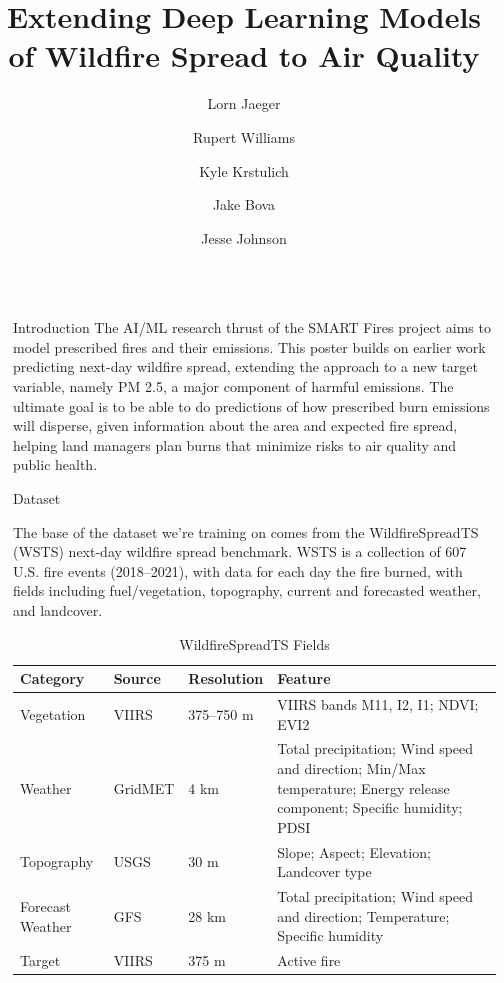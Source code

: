 \documentclass[final]{beamer}
\title{Extending Deep Learning Models of Wildfire Spread to Air Quality}
\author{Lorn Jaeger   \and Rupert Williams  \and Kyle Krstulich \and Jake Bova \and Jesse Johnson}
\newlength{\sepwidth}
\newlength{\colwidth}
\newcommand{\separatorcolumn}{\begin{column}{\sepwidth}\end{column}}
\begin{document}


\begin{frame}[t]
\begin{columns}[t]
\separatorcolumn

\begin{column}{\colwidth}

  \begin{block}{Introduction}
    The AI/ML research thrust of the SMART Fires project aims to model prescribed fires and their emissions. This poster builds on earlier work predicting next-day wildfire spread, extending the approach to a new target variable, namely PM 2.5, a major component of harmful emissions. The ultimate goal is to be able to do predictions of how prescribed burn emissions will disperse, given information about the area and expected fire spread, helping land managers plan burns that minimize risks to air quality and public health.

  \end{block}


  \begin{block}{Dataset}

The base of the dataset we're training on comes from the WildfireSpreadTS (WSTS) next-day wildfire spread benchmark. WSTS is a collection of 607 U.S. fire events (2018–2021), with data for each day the fire burned, with fields including fuel/vegetation, topography, current and forecasted weather, and landcover. 

\begin{table}[h!]
\centering
\small
\begin{tabular}{l l l p{12cm}}
\toprule
\textbf{Category} & \textbf{Source} & \textbf{Resolution} & \textbf{Feature} \\
\midrule
Vegetation & VIIRS   & 375--750 m & VIIRS bands M11, I2, I1; NDVI; EVI2 \\
\midrule
Weather & GridMET  & 4 km       & Total precipitation; Wind speed and direction; Min/Max temperature; Energy release component; Specific humidity; PDSI \\
\midrule
Topography & USGS & 30 m       & Slope; Aspect; Elevation; Landcover type \\
\midrule
Forecast Weather & GFS & 28 km  & Total precipitation; Wind speed and direction; Temperature; Specific humidity \\
\midrule
Target & VIIRS & 375 m        & Active fire \\
\bottomrule
\end{tabular}
\caption{WildfireSpreadTS Fields}
\end{table}





\end{block}
\end{column}
\end{columns}
\end{frame}
\end{document}
